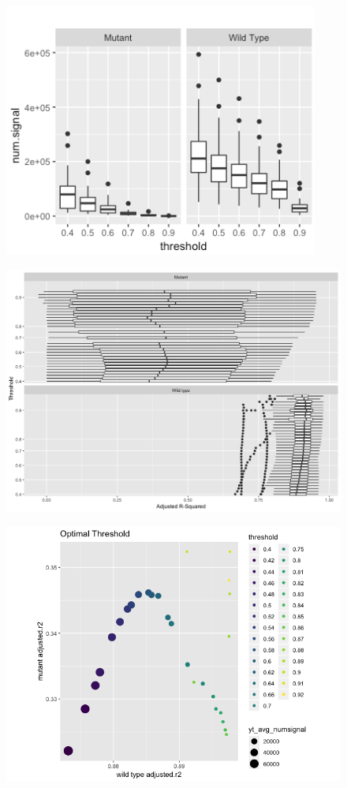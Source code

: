 \documentclass[10pt,letterpaper]{article}
\begin{document}
\begin{figure}[H]
\includegraphics[width=0.9\linewidth]{visualization_paper/thresh_numsig_boxplot} \end{figure}

\begin{figure}[H]
\includegraphics[width=0.9\linewidth]{visualization_paper/threshold_boxplot} \end{figure}

\begin{figure}[H]
\includegraphics[width=0.9\linewidth]{visualization_paper/optimal_threshold2} \end{figure}
\end{document}
